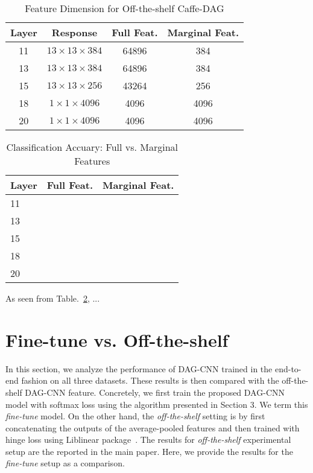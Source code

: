 \documentclass[10pt,twocolumn,letterpaper]{article}
\begin{document}
\begin{table}[htbp]
\begin{center}
\begin{tabular}{|c|c|c|c|}
\hline
Layer & Response &  Full Feat.& Marginal Feat.\\
\hline
11 & $13\times 13 \times 384$ & 64896 & 384 \\
13 & $13\times 13 \times 384$ & 64896 & 384 \\
15 & $13\times 13 \times 256$ & 43264 & 256 \\
18 & $1\times 1 \times 4096$ & 4096 & 4096 \\
20 & $1\times 1 \times 4096$ & 4096 & 4096 \\

\hline
\end{tabular}
\end{center}
\caption{Feature Dimension for Off-the-shelf Caffe-DAG}
\label{table:feat_dim}
\end{table}

\begin{table}[htbp]
\begin{center}
\begin{tabular}{|l|c|c|}
\hline
Layer & Full Feat. & Marginal Feat. \\
\hline
11 &  &   \\
13 &  &   \\
15 &  &   \\
18 &  &   \\
20 &  &   \\

\hline
\end{tabular}
\end{center}
\caption{Classification Accuary: Full vs. Marginal Features}
\label{table:perf_full}
\end{table}


As seen from Table.~\ref{table:perf_full}, ...


\section{Fine-tune vs. Off-the-shelf}

In this section, we analyze the performance of DAG-CNN trained in the end-to-end fashion on all three datasets. These results is then compared with the off-the-shelf DAG-CNN feature. Concretely, we first train the proposed DAG-CNN model with softmax loss using the algorithm presented in Section 3. We term this \textit{fine-tune} model. On the other hand, the \textit{off-the-shelf} setting is by first concatenating the outputs of the average-pooled features and then trained with hinge loss using Liblinear package~\cite{liblinear}. The results for \textit{off-the-shelf} experimental setup are the reported in the main paper. Here, we provide the results for the \textit{fine-tune} setup as a comparison. 
\end{document}
